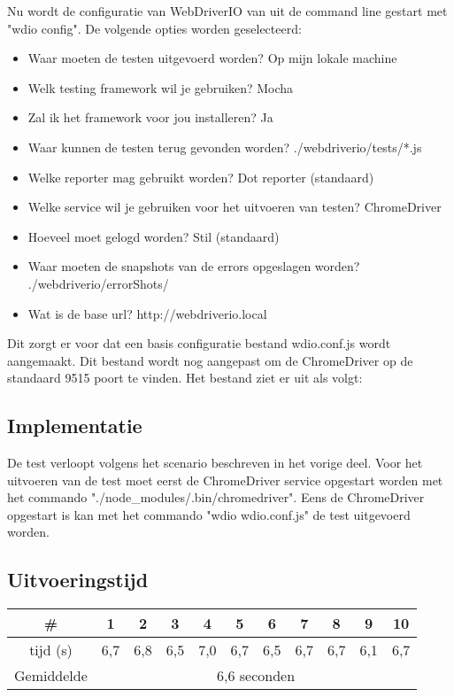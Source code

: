 Nu wordt de configuratie van WebDriverIO van uit de command line gestart met "wdio config". De volgende opties worden geselecteerd:
\begin{itemize}
\item Waar moeten de testen uitgevoerd worden? Op mijn lokale machine
\item Welk testing framework wil je gebruiken? Mocha
\item Zal ik het framework voor jou installeren? Ja
\item Waar kunnen de testen terug gevonden worden? ./webdriverio/tests/*.js
\item Welke reporter mag gebruikt worden? Dot reporter (standaard)
\item Welke service wil je gebruiken voor het uitvoeren van testen? ChromeDriver
\item Hoeveel moet gelogd worden? Stil (standaard)
\item Waar moeten de snapshots van de errors opgeslagen worden? ./webdriverio/errorShots/
\item Wat is de base url? http://webdriverio.local
\end{itemize}
Dit zorgt er voor dat een basis configuratie bestand wdio.conf.js wordt aangemaakt. Dit bestand wordt nog aangepast om de ChromeDriver op de standaard 9515 poort te vinden. Het bestand ziet er uit als volgt: 



\subsection{Implementatie}
De test verloopt volgens het scenario beschreven in het vorige deel. Voor het uitvoeren van de test moet eerst de ChromeDriver service opgestart worden met het commando "./node\_modules/.bin/chromedriver". Eens de ChromeDriver opgestart is kan met het commando "wdio wdio.conf.js" de test uitgevoerd worden.



\subsection{Uitvoeringstijd}

\begin{center}
\begin{tabular}{ |c| |c |c |c |c |c |c |c |c |c |c| }
\hline
	\# & 1 & 2 & 3 & 4 & 5 & 6 & 7 & 8 & 9 & 10\\
\hline
	tijd (s) & 6,7 & 6,8 & 6,5 & 7,0 & 6,7 & 6,5 & 6,7 & 6,7 & 6,1 & 6,7\\
\hline
 Gemiddelde & \multicolumn{10}{c|}{6,6 seconden}\\
\hline
\end{tabular}
\end{center}

